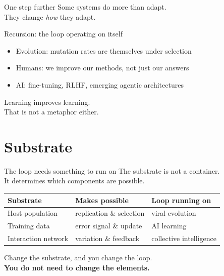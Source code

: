 \documentclass[aspectratio=169, 10pt]{beamer}
\begin{document}
\begin{frame}{One step further}
  Some systems do more than adapt.\\[0.5em]
  They change \textit{how} they adapt.

  \bigskip
  \begin{block}{Recursion: the loop operating on itself}
    \begin{itemize}
      \item Evolution: mutation rates are themselves under selection
      \item Humans: we improve our methods, not just our answers
      \item AI: fine-tuning, RLHF, emerging agentic architectures
    \end{itemize}
  \end{block}

  \bigskip
  \begin{alertblock}{}
    \centering
    Learning improves learning.\\
    That is not a metaphor either.
  \end{alertblock}
\end{frame}

\section{Substrate}

\begin{frame}{The loop needs something to run on}
  The substrate is not a container.\\
  It determines which components are possible.

  \bigskip
  \begin{tabular}{lll}
    \toprule
    Substrate            & Makes possible            & Loop running on \\
    \midrule
    Host population      & replication \& selection  & viral evolution \\
    Training data        & error signal \& update    & AI learning \\
    Interaction network  & variation \& feedback     & collective intelligence \\
    \bottomrule
  \end{tabular}

  \bigskip
  \begin{alertblock}{}
    \centering
    Change the substrate, and you change the loop.\\
    \textbf{You do not need to change the elements.}
  \end{alertblock}
\end{frame}
\end{document}
